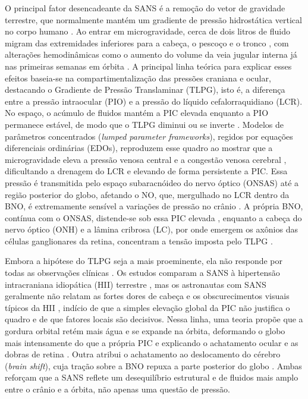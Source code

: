 \documentclass[article, hidelinks,oneside,12pt]{abntex2}
\begin{document}
O principal fator desencadeante da SANS é a remoção do vetor de gravidade terrestre, que normalmente mantém um gradiente de pressão hidrostática vertical no corpo humano \cite{huang2019}. Ao entrar em microgravidade, cerca de dois litros de fluido migram das extremidades inferiores para a cabeça, o pescoço e o tronco \cite{moore1987, scott2019, huang2019}, com alterações hemodinâmicas como o aumento do volume da veia jugular interna já nas primeiras semanas em órbita \cite{mader2011, arbeille, petersen}. A principal linha teórica para explicar esses efeitos baseia-se na compartimentalização das pressões craniana e ocular, destacando o Gradiente de Pressão Translaminar (TLPG), isto é, a diferença entre a pressão intraocular (PIO) e a pressão do líquido cefalorraquidiano (LCR). No espaço, o acúmulo de fluidos mantém a PIC elevada enquanto a PIO permanece estável, de modo que o TLPG diminui ou se inverte \cite{berdahl2012, greenwald2021, zarrinbakhsh2025}. Modelos de parâmetros concentrados (\textit{lumped parameter frameworks}), regidos por equações diferenciais ordinárias (EDOs), reproduzem esse quadro ao mostrar que a microgravidade eleva a pressão venosa central e a congestão venosa cerebral \cite{salerni2019, nigro2026, ong2023}, dificultando a drenagem do LCR e elevando de forma persistente a PIC. Essa pressão é transmitida pelo espaço subaracnóideo do nervo óptico (ONSAS) até a região posterior do globo, afetando o NO, que, mergulhado no LCR dentro da BNO, é extremamente sensível a variações de pressão no crânio \cite{berdahl2012}. A própria BNO, contínua com o ONSAS, distende-se sob essa PIC elevada \cite{lioi2024}, enquanto a cabeça do nervo óptico (ONH) e a lâmina cribrosa (LC), por onde emergem os axônios das células ganglionares da retina, concentram a tensão imposta pelo TLPG \cite{newson2006, shin2017, liu2023}.

Embora a hipótese do TLPG seja a mais proeminente, ela não responde por todas as observações clínicas \cite{yang2022}. Os estudos comparam a SANS à hipertensão intracraniana idiopática (HII) terrestre \cite{sibony2023}, mas os astronautas com SANS geralmente não relatam as fortes dores de cabeça e os obscurecimentos visuais típicos da HII \cite{zhang2025}, indício de que a simples elevação global da PIC não justifica o quadro e de que fatores locais são decisivos. Nessa linha, uma teoria propõe que a gordura orbital retém mais água e se expande na órbita, deformando o globo mais intensamente do que a própria PIC e explicando o achatamento ocular e as dobras de retina \cite{reilly2023}. Outra atribui o achatamento ao deslocamento do cérebro (\textit{brain shift}), cuja tração sobre a BNO repuxa a parte posterior do globo \cite{carter2023}. Ambas reforçam que a SANS reflete um desequilíbrio estrutural e de fluidos mais amplo entre o crânio e a órbita, não apenas uma questão de pressão.
\end{document}
